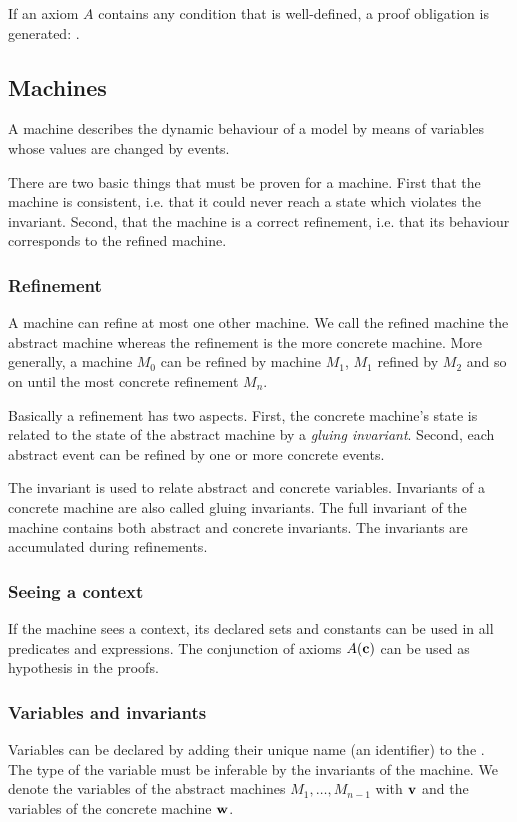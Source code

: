 If an axiom $A$ contains any condition that is well-defined, a proof obligation is generated:
.


\subsection{Machines}
A machine describes the dynamic behaviour of a model by means of variables whose values are changed by events.

There are two basic things that must be proven for a machine. First that the machine is
consistent, i.e. that it could never reach a state which violates the invariant. Second,
that the machine is a correct refinement, i.e. that its behaviour corresponds to the
refined machine.

\subsubsection{Refinement}
A machine can refine at most one other machine. 
We call the refined machine the abstract machine whereas the refinement is the more concrete machine. 
More generally, a machine $M_0$ can be refined by machine $M_1$, $M_1$ refined by $M_2$ 
and so on until the most concrete refinement $M_n$. 

Basically a refinement has two aspects. First, the concrete machine's state is related to the state of the
abstract machine by a \emph{gluing invariant}. Second, each abstract event can be refined by one or more
concrete events.

The invariant is used to relate abstract and concrete variables. Invariants of a concrete machine are also called gluing invariants.
The full invariant of the machine contains both abstract and concrete invariants. 
The invariants are accumulated during refinements.

\subsubsection{Seeing a context}
If the machine sees a context, its declared sets and constants can be used in
 all predicates and expressions.
The conjunction of axioms $A(\textbf{c})$ can be used as hypothesis in the proofs.

\subsubsection{Variables and invariants}
Variables can be declared by adding their unique name (an identifier) to the .
The type of the variable must be inferable by the invariants of the machine.
We denote the variables of the abstract machines $M_1,\ldots,M_{n-1}$ with $\textbf{v}$ and
the variables of the concrete machine $\textbf{w}$.

